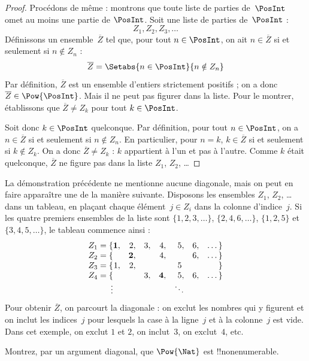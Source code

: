 \documentclass[11pt,a4paper,openany]{memoir}
\begin{document}
\begin{proof}
Procédons de même : montrons que toute liste de parties
de~$\PosInt$ omet au moins une partie de $\PosInt$.
Soit une liste de parties de~$\PosInt$ :
\[
Z_{1}, Z_{2}, Z_{3}, \dots
\]
Définissons un ensemble~$\overline{Z}$ tel que, pour tout
$n \in \PosInt$, on ait $n \in \overline{Z}$ si et seulement si
$n \notin Z_{n}$ :
\[
\overline{Z} = \Setabs{n \in \PosInt}{n \notin Z_n}
\]
Par définition, $\overline{Z}$ est un ensemble d’entiers strictement
positifs ; on a donc $\overline{Z} \in \Pow{\PosInt}$.
Mais il ne peut pas figurer dans la liste. Pour le montrer,
établissons que $\overline{Z} \neq Z_k$ pour tout $k \in \PosInt$.

Soit donc $k \in \PosInt$ quelconque. Par définition,
pour tout $n \in \PosInt$, on a $n \in \overline{Z}$ si et seulement
si $n \notin Z_n$. En particulier, pour $n=k$,
$k \in \overline{Z}$ si et seulement si $k \notin Z_k$.
On a donc $\overline{Z} \neq Z_k$ :
$k$ appartient à l’un et pas à l’autre. Comme $k$ était quelconque,
$\overline{Z}$ ne figure pas dans la liste $Z_1$, $Z_2$, \dots
\end{proof}

\begin{explain}
La démonstration précédente ne mentionne aucune diagonale,
mais on peut en faire apparaître une de la manière suivante.
Disposons les ensembles $Z_1$, $Z_2$, \dots{} dans un tableau,
en plaçant chaque élément~$j \in Z_i$ dans la colonne d’indice~$j$.
Si les quatre premiers ensembles de la liste sont
$\{1,2,3,\dots\}$, $\{2, 4, 6, \dots\}$, $\{1,2,5\}$
et $\{3,4,5,\dots\}$, le tableau commence ainsi :
\[
\begin{array}{r@{}rrrrrrr}
  Z_1 = \{ & \mathbf{1}, & 2, & 3, & 4, & 5, & 6, & \dots\}\\
  Z_2 = \{ &  & \mathbf{2}, &  & 4, &  & 6, & \dots\}\\
  Z_3 = \{ & 1, & 2, &  &  & 5\phantom{,} &  & \}\\
  Z_4 = \{ &  &  & 3, & \mathbf{4}, & 5, & 6, & \dots\}\\
  \vdots & & & & & \ddots
\end{array}
\]
Pour obtenir $\overline{Z}$, on parcourt la diagonale : on exclut
les nombres qui y figurent et on inclut les indices~$j$ pour lesquels
la case à la ligne~$j$ et à la colonne~$j$ est vide. Dans cet exemple,
on exclut $1$ et $2$, on inclut~$3$, on exclut~$4$, etc.
\end{explain}

\begin{prob}
Montrez, par un argument diagonal, que $\Pow{\Nat}$ est !!{nonenumerable}.
\end{prob}
\end{document}
